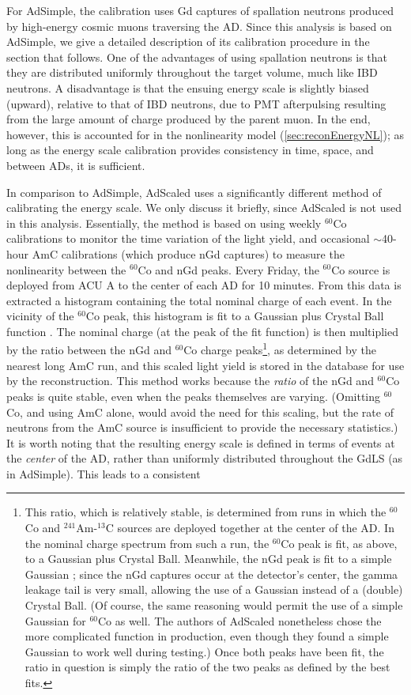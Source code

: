 \documentclass[../thesis.tex]{subfiles}
\begin{document}
For AdSimple, the calibration uses Gd captures of spallation neutrons produced by high-energy cosmic muons traversing the AD. Since this analysis is based on AdSimple, we give a detailed description of its calibration procedure in the section that follows. One of the advantages of using spallation neutrons is that they are distributed uniformly throughout the target volume, much like IBD neutrons. A disadvantage is that the ensuing energy scale is slightly biased (upward), relative to that of IBD neutrons, due to PMT afterpulsing resulting from the large amount of charge produced by the parent muon. In the end, however, this is accounted for in the nonlinearity model (\autoref{sec:reconEnergyNL}); as long as the energy scale calibration provides consistency in time, space, and between ADs, it is sufficient.

In comparison to AdSimple, AdScaled uses a significantly different method of calibrating the energy scale. We only discuss it briefly, since AdScaled is not used in this analysis. Essentially, the method is based on using weekly $^{60}$Co calibrations to monitor the time variation of the light yield, and occasional $\sim$40-hour AmC calibrations (which produce nGd captures) to measure the nonlinearity between the $^{60}$Co and nGd peaks. Every Friday, the $^{60}$Co source is deployed from ACU A to the center of each AD for 10 minutes. From this data is extracted a histogram containing the total nominal charge of each event. In the vicinity of the $^{60}$Co peak, this histogram is fit to a Gaussian plus Crystal Ball function \cite{adScaledTechnote}. The nominal charge (at the peak of the fit function) is then multiplied by the ratio between the nGd and $^{60}$Co charge peaks\footnote{This ratio, which is relatively stable, is determined from runs in which the $^{60}$Co and $^{241}$Am-$^{13}$C sources are deployed together at the center of the AD. In the nominal charge spectrum from such a run, the $^{60}$Co peak is fit, as above, to a Gaussian plus Crystal Ball. Meanwhile, the nGd peak is fit to a simple Gaussian \cite{adScaledTechnote}; since the nGd captures occur at the detector's center, the gamma leakage tail is very small, allowing the use of a Gaussian instead of a (double) Crystal Ball. (Of course, the same reasoning would permit the use of a simple Gaussian for $^{60}$Co as well. The authors of AdScaled nonetheless chose the more complicated function in production, even though they found a simple Gaussian to work well during testing.) Once both peaks have been fit, the ratio in question is simply the ratio of the two peaks as defined by the best fits.}, as determined by the nearest long AmC run, and this scaled light yield is stored in the database for use by the reconstruction. This method works because the \emph{ratio} of the nGd and $^{60}$Co peaks is quite stable, even when the peaks themselves are varying. (Omitting $^{60}$Co, and using AmC alone, would avoid the need for this scaling, but the rate of neutrons from the AmC source is insufficient to provide the necessary statistics.) It is worth noting that the resulting energy scale is defined in terms of events at the \emph{center} of the AD, rather than uniformly distributed throughout the GdLS (as in AdSimple). This leads to a consistent 
\end{document}
